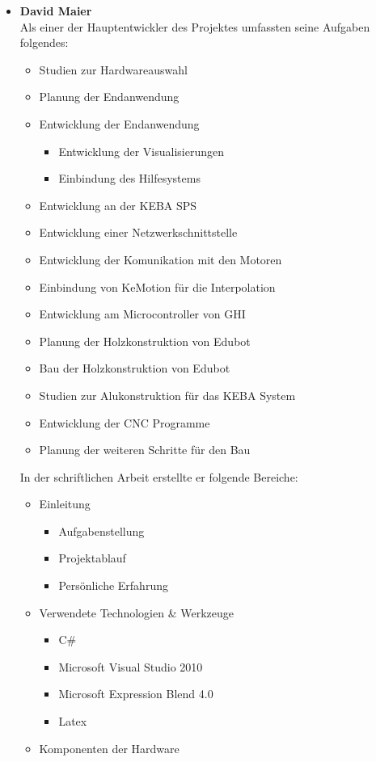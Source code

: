 \begin{itemize}
\item \textbf{David Maier}\\
Als einer der Hauptentwickler des Projektes umfassten seine Aufgaben folgendes:
\begin{itemize}
\item Studien zur Hardwareauswahl
\item Planung der Endanwendung
\item Entwicklung der Endanwendung
\begin{itemize}
\item Entwicklung der Visualisierungen
\item Einbindung des Hilfesystems
\end{itemize}
\item Entwicklung an der KEBA SPS
\item Entwicklung einer Netzwerkschnittstelle 
\item Entwicklung der Komunikation mit den Motoren
\item Einbindung von KeMotion für die Interpolation
\item Entwicklung am Microcontroller von GHI
\item Planung der Holzkonstruktion von Edubot
\item Bau der Holzkonstruktion von Edubot
\item Studien zur Alukonstruktion für das KEBA System
\item Entwicklung der CNC Programme
\item Planung der weiteren Schritte für den Bau
\end{itemize}

In der schriftlichen Arbeit erstellte er folgende Bereiche:
\begin{itemize}
\item Einleitung
\begin{itemize}
\item Aufgabenstellung
\item Projektablauf
\item Persönliche Erfahrung
\end{itemize}
\item Verwendete Technologien \& Werkzeuge
\begin{itemize}
\item C\#
\item Microsoft Visual Studio 2010
\item Microsoft Expression Blend 4.0
\item Latex
\end{itemize}
\item Komponenten der Hardware
\end{itemize}
     

\end{itemize}
   
